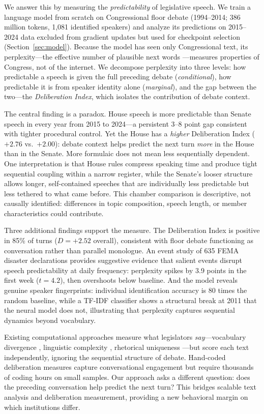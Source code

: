 \documentclass[12pt]{article}
\newcommand{\DI}{\mathit{D}}
\begin{document}
We answer this by measuring the \textit{predictability} of legislative speech. We train a language model from scratch on Congressional floor debate (1994--2014; 386 million tokens, 1,081 identified speakers) and analyze its predictions on 2015--2024 data excluded from gradient updates but used for checkpoint selection (Section~\ref{sec:model}). Because the model has seen only Congressional text, its perplexity---the effective number of plausible next words \citep{shannon1948}---measures properties of Congress, not of the internet. We decompose perplexity into three levels: how predictable a speech is given the full preceding debate (\textit{conditional}), how predictable it is from speaker identity alone (\textit{marginal}), and the gap between the two---the \textit{Deliberation Index}, which isolates the contribution of debate context.

The central finding is a paradox. House speech is more predictable than Senate speech in every year from 2015 to 2024---a persistent 3--8 point gap consistent with tighter procedural control. Yet the House has a \textit{higher} Deliberation Index ($+2.76$ vs.\ $+2.00$): debate context helps predict the next turn \textit{more} in the House than in the Senate. More formulaic does not mean less sequentially dependent. One interpretation is that House rules compress speaking time and produce tight sequential coupling within a narrow register, while the Senate's looser structure allows longer, self-contained speeches that are individually less predictable but less tethered to what came before. This chamber comparison is descriptive, not causally identified: differences in topic composition, speech length, or member characteristics could contribute.

Three additional findings support the measure. The Deliberation Index is positive in 85\% of turns ($\DI = +2.52$ overall), consistent with floor debate functioning as conversation rather than parallel monologue. An event study of 635 FEMA disaster declarations provides suggestive evidence that salient events disrupt speech predictability at daily frequency: perplexity spikes by 3.9 points in the first week ($t = 4.2$), then overshoots below baseline. And the model reveals genuine speaker fingerprints: individual identification accuracy is 80 times the random baseline, while a TF-IDF classifier shows a structural break at 2011 that the neural model does not, illustrating that perplexity captures sequential dynamics beyond vocabulary.

Existing computational approaches measure what legislators \textit{say}---vocabulary divergence \citep{gentzkow2019}, linguistic complexity \citep{spirling2016}, rhetorical uniqueness \citep{zhou2024}---but score each text independently, ignoring the sequential structure of debate. Hand-coded deliberation measures \citep{steiner2004, bachtiger2019} capture conversational engagement but require thousands of coding hours on small samples. Our approach asks a different question: does the preceding conversation help predict the next turn? This bridges scalable text analysis and deliberation measurement, providing a new behavioral margin on which institutions differ.
\end{document}

